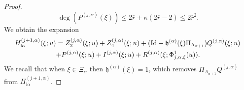 \documentclass[10pt,a4paper]{amsart}
\theoremstyle{plain}
\theoremstyle{definition}
\DeclareMathOperator{\lo}{lo}
\newcommand{\1}{\mathbf{1}}
\begin{document}
\begin{proof}
\begin{equation}
\label{eq:d-P}
\deg(P^{(j,\alpha)}(\xi))\leq 2\overline{r}+\kappa(2\overline{r}-2) \leq 2\overline{r}^{2}.
\end{equation}
We obtain the expansion
\begin{multline}
\label{eq:expansion2}
\hspace*{-.5mm}H_{\lo}^{(j+1,\alpha)}(\xi;u)
= Z_{2}^{(j,\alpha)}(\xi;u) + Z_{4}^{(j,\alpha)}(\xi;u) +(\mathrm{Id} -\mathfrak{h}^{(\alpha)}(\xi)\Pi_{\Lambda_{\alpha+1}})Q^{(j,\alpha)}(\xi;u) \\
+ P^{(j,\alpha)}(\xi;u) + I^{(j,\alpha)}(\xi;u) + R^{(j,\alpha)}(\xi;\Phi_{j,\alpha,\xi}^{1}(u)).
\end{multline}
We recall that when $\xi\in\Xi_{\alpha}$ then $\mathfrak{h}^{(\alpha)}(\xi)=1$, which removes $\Pi_{\Lambda_{\alpha+1}}Q^{(j,\alpha)}$ from $H_{\lo}^{(j+1,\alpha)}$.


\end{proof}
\end{document}
